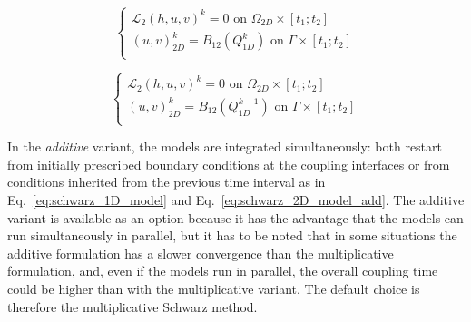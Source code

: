 \begin{equation}
\left\lbrace
\begin{array}{l}
\mathcal{L}_2 (h,u,v)^{k} = 0 \textrm{ on } \Omega_{2D} \times [t_1;t_2]\\
(u,v)_{2D}^{k} = B_{12}(Q^{k}_{1D}) \textrm{ on } \Gamma \times [t_1;t_2] \\
\end{array}
\right.
\label{eq:schwarz_2D_model_multi}
\end{equation}

\begin{equation}
\left\lbrace
\begin{array}{l}
\mathcal{L}_2 (h,u,v)^{k} = 0 \textrm{ on } \Omega_{2D} \times [t_1;t_2]\\
(u,v)_{2D}^{k} = B_{12}(Q^{k-1}_{1D}) \textrm{ on } \Gamma \times [t_1;t_2] \\
\end{array}
\right.
\label{eq:schwarz_2D_model_add}
\end{equation}

In the \emph{additive} variant, the models are integrated simultaneously:
both restart from initially prescribed boundary conditions at the
coupling interfaces or from conditions inherited from the
previous time interval as in Eq.~\ref{eq:schwarz_1D_model} and
Eq.~\ref{eq:schwarz_2D_model_add}. The additive variant is available
as an option because it has the advantage that the models can run
simultaneously in parallel, but it has to be noted that in some
situations the additive formulation has a slower convergence than the
multiplicative formulation, and, even if the models run in
parallel, the overall coupling time could be higher than with the
multiplicative variant. The default choice is therefore the
multiplicative Schwarz method.


